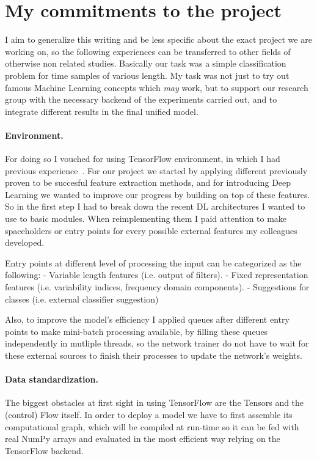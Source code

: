 \section{My commitments to the project}

I aim to generalize this writing and be less specific about the exact project we are working on, so the following experiences can be transferred to other fields of otherwise non related studies.
Basically our task was a simple classification problem for time samples of various length.
My task was not just to try out famous Machine Learning concepts which \textit{may} work, but to support our research group with the necessary backend of the experiments carried out, and to integrate different results in the final unified model.

\paragraph{Environment.}
For doing so I vouched for using TensorFlow environment, in which I had previous experience~\cite{github-projects}.
For our project we started by applying different previously proven to be succesful feature extraction methods, and for introducing Deep Learning we wanted to improve our progress by building on top of these features.
So in the first step I had to break down the recent DL architectures I wanted to use to basic modules.
When reimplementing them I paid attention to make spaceholders or entry points for every possible external features my colleagues developed.

Entry points at different level of processing the input can be categorized as the following:
- Variable length features (i.e. output of filters).
- Fixed representation features (i.e. variability indices, frequency domain components).
- Suggestions for classes (i.e. external classifier suggestion)

Also, to improve the model's efficiency I applied queues after different entry points to make mini-batch processing available, by filling these queues independently in mutliple threads, so the network trainer do not have to wait for these external sources to finish their processes to update the network's weights.

\paragraph{Data standardization.}
The biggest obstacles at first sight in using TensorFlow are the Tensors and the (control) Flow itself. In order to deploy a model we have to first assemble its computational graph, which will be compiled at run-time so it can be fed with real NumPy arrays and evaluated in the most efficient way relying on the TensorFlow backend.


